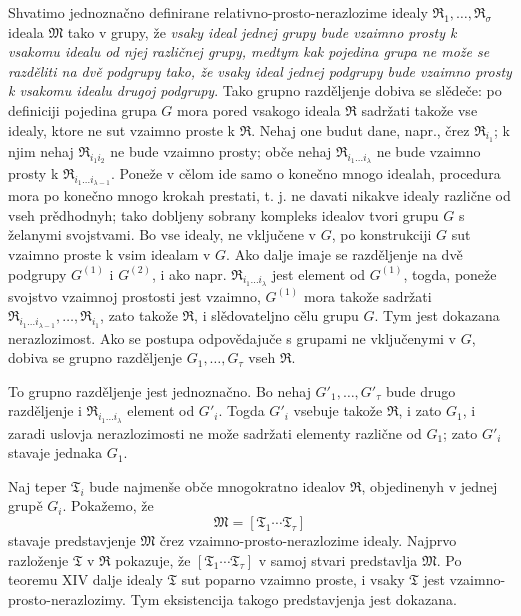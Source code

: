 \documentclass[11pt]{article}
\newcommand{\ideal}[1]{\mathfrak{#1}}
\begin{document}
Shvatimo jednoznačno definirane relativno-prosto-nerazlozime idealy \(\ideal R_1,\ldots,\ideal R_\sigma\) ideala \(\ideal M\) tako v grupy, že \emph{vsaky ideal jednej grupy bude vzaimno prosty k vsakomu idealu od njej različnej grupy, medtym kak pojedina grupa ne može se razděliti na dvě podgrupy tako, že vsaky ideal jednej podgrupy bude vzaimno prosty k vsakomu idealu drugoj podgrupy}. Tako grupno razděljenje dobiva se slědeče: po definiciji pojedina grupa \(G\) mora pored vsakogo ideala \(\ideal R\) sadržati takože vse idealy, ktore ne sut vzaimno proste k \(\ideal R\). Nehaj one budut dane, napr., črez \(\ideal R_{i_1}\); k njim nehaj \(\ideal R_{i_1i_2}\) ne bude vzaimno prosty; obče nehaj \(\ideal R_{i_1\ldots i_\lambda}\) ne bude vzaimno prosty k \(\ideal R_{i_1\ldots i_{\lambda-1}}\). Poneže v cělom ide samo o konečno mnogo idealah, procedura mora po konečno mnogo krokah prestati, t. j. ne davati nikakve idealy različne od vseh prědhodnyh; tako dobljeny sobrany kompleks idealov tvori grupu \(G\) s želanymi svojstvami. Bo vse idealy, ne vključene v \(G\), po konstrukciji \(G\) sut vzaimno proste k vsim idealam v \(G\). Ako dalje imaje se razděljenje na dvě podgrupy \(G^{(1)}\) i \(G^{(2)}\), i ako napr. \(\ideal R_{i_1\ldots i_\lambda}\) jest element od \(G^{(1)}\), togda, poneže svojstvo vzaimnoj prostosti jest vzaimno, \(G^{(1)}\) mora takože sadržati \(\ideal R_{i_1\ldots i_{\lambda-1}},\ldots,\ideal R_{i_1}\), zato takože \(\ideal R\), i slědovateljno cělu grupu \(G\). Tym jest dokazana nerazlozimost. Ako se postupa odpovědajuče s grupami ne vključenymi v \(G\), dobiva se grupno razděljenje \(G_1,\ldots,G_\tau\) vseh \(\ideal R\).

To grupno razděljenje jest jednoznačno. Bo nehaj \(G'_1,\ldots,G'_\tau\) bude drugo razděljenje i \(\ideal R_{i_1\ldots i_\lambda}\) element od \(G'_i\). Togda \(G'_i\) vsebuje takože \(\ideal R\), i zato \(G_1\), i zaradi uslovja nerazlozimosti ne može sadržati elementy različne od \(G_1\); zato \(G'_i\) stavaje jednaka \(G_1\).

Naj teper \(\ideal T_i\) bude najmenše obče mnogokratno idealov \(\ideal R\), objedinenyh v jednej grupě \(G_i\). Pokažemo, že
\[
 \ideal M=[\ideal T_1\cdots\ideal T_\tau]
\]
stavaje predstavjenje \(\ideal M\) črez vzaimno-prosto-nerazlozime idealy. Najprvo razloženje \(\ideal T\) v \(\ideal R\) pokazuje, že \([\ideal T_1\cdots\ideal T_\tau]\) v samoj stvari predstavlja \(\ideal M\). Po teoremu XIV dalje idealy \(\ideal T\) sut poparno vzaimno proste, i vsaky \(\ideal T\) jest vzaimno-prosto-nerazlozimy. Tym eksistencija takogo predstavjenja jest dokazana.
\end{document}
